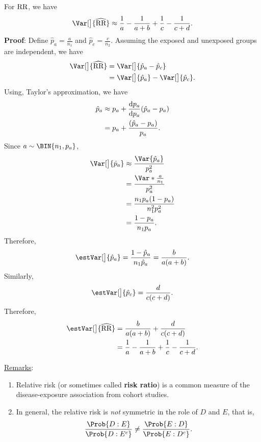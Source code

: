 \begin{Result}{}
    For $ \text{RR} $, we have
    \[ \Var[\big]{\log{\widehat{\RR}}}\approx \frac{1}{a}-\frac{1}{a+b}+\frac{1}{c}-\frac{1}{c+d}. \]
    \tcblower{}
    \textbf{Proof}: Define $ \hat{p}_a=\frac{a}{n_1} $ and $ \hat{p}_c=\frac{c}{n_2} $.
    Assuming the exposed and unexposed groups are independent, we have
    \begin{align*}
        \Var[\big]{\log{\widehat{\RR}}}
         & =\Var[\big]{\log{\hat{p}_a}-\log{\hat{p}_c}}              \\
         & =\Var[\big]{\log{\hat{p}_a}}-\Var[\big]{\log{\hat{p}_c}}.
    \end{align*}
    Using, Taylor's approximation, we have
    \begin{align*}
        \log{\hat{p}_a}
         & \approx \log{p_a}+\odv{\log{p_a}}{p_a}(\hat{p}_a-p_a) \\
         & =\log{p_a}+\frac{(\hat{p}_a-p_a)}{p_a}.
    \end{align*}
    Since $ a \sim \BIN{n_1,p_a} $,
    \begin{align*}
        \Var[\big]{\log{\hat{p}_a}}
         & \approx \frac{\Var{\hat{p}_a}}{p_a^2} \\
         & =\frac{\Var*{\frac{a}{n_1}}}{p_a^2}   \\
         & =\frac{n_1 p_a(1-p_a)}{n_1^2p_a^2}    \\
         & =\frac{1-p_a}{n_1p_a}.
    \end{align*}
    Therefore,
    \[ \estVar[\big]{\log{\hat{p}_a}}=\frac{1-\hat{p}_a}{n_1\hat{p}_a}=\frac{b}{a(a+b)}. \]
    Similarly,
    \[ \estVar[\big]{\log{\hat{p}_c}}=\frac{d}{c(c+d)}. \]
    Therefore,
    \begin{align*}
        \estVar[\big]{\log{\widehat{\RR}}}
         & =\frac{b}{a(a+b)}+\frac{d}{c(c+d)}                    \\
         & =\frac{1}{a}-\frac{1}{a+b}+\frac{1}{c}-\frac{1}{c+d}.
    \end{align*}
\end{Result}
\underline{Remarks}:
\begin{enumerate}[(1)]
    \item Relative risk (or sometimes called \textbf{risk ratio}) is a common
          measure of the disease-exposure association from cohort studies.
    \item In general, the relative risk is \emph{not} symmetric in the role of $ D $ and $ E $,
          that is,
          \[ \frac{\Prob{D\given E}}{\Prob{D\given E^c}}\ne \frac{\Prob{E\given D}}{\Prob{E\given D^c}}. \]
\end{enumerate}
